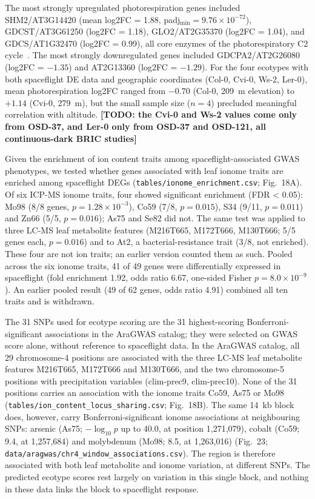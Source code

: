\documentclass[sn-mathphys-num,Basic]{sn-jnl}
\begin{document}
The most strongly upregulated photorespiration genes included SHM2/AT3G14420 (mean log2FC = 1.88, padj$_{\text{min}} = 9.76 \times 10^{-72}$), GDCST/AT3G61250 (log2FC = 1.18), GLO2/AT2G35370 (log2FC = 1.04), and GDCS/AT1G32470 (log2FC = 0.99), all core enzymes of the photorespiratory C2 cycle~\cite{Bauwe2012}. The most strongly downregulated genes included GDCPA2/AT2G26080 (log2FC = $-1.35$) and AT2G13360 (log2FC = $-1.29$). For the four ecotypes with both spaceflight DE data and geographic coordinates (Col-0, Cvi-0, Ws-2, Ler-0), mean photorespiration log2FC ranged from $-0.70$ (Col-0, 209~m elevation) to $+1.14$ (Cvi-0, 279~m), but the small sample size ($n = 4$) precluded meaningful correlation with altitude. \textbf{[TODO: the Cvi-0 and Ws-2 values come only from OSD-37, and Ler-0 only from OSD-37 and OSD-121, all continuous-dark BRIC studies]}

Given the enrichment of ion content traits among spaceflight-associated GWAS phenotypes, we tested whether genes associated with leaf ionome traits are enriched among spaceflight DEGs (\texttt{tables/ionome\_enrichment.csv}; Fig.~18A). Of six ICP-MS ionome traits, four showed significant enrichment (FDR < 0.05): Mo98 (8/8 genes, $p = 1.28 \times 10^{-3}$), Co59 (7/8, $p = 0.015$), S34 (9/11, $p = 0.011$) and Zn66 (5/5, $p = 0.016$); As75 and Se82 did not. The same test was applied to three LC-MS leaf metabolite features (M216T665, M172T666, M130T666; 5/5 genes each, $p = 0.016$) and to At2, a bacterial-resistance trait (3/8, not enriched). These four are not ion traits; an earlier version counted them as such. Pooled across the six ionome traits, 41 of 49 genes were differentially expressed in spaceflight (fold enrichment 1.92, odds ratio 6.67, one-sided Fisher $p = 8.0 \times 10^{-9}$). An earlier pooled result (49 of 62 genes, odds ratio 4.91) combined all ten traits and is withdrawn.

The 31 SNPs used for ecotype scoring are the 31 highest-scoring Bonferroni-significant associations in the AraGWAS catalog; they were selected on GWAS score alone, without reference to spaceflight data. In the AraGWAS catalog, all 29 chromosome-4 positions are associated with the three LC-MS leaf metabolite features M216T665, M172T666 and M130T666, and the two chromosome-5 positions with precipitation variables (clim-prec9, clim-prec10). None of the 31 positions carries an association with the ionome traits Co59, As75 or Mo98 (\texttt{tables/ion\_content\_locus\_sharing.csv}; Fig.~18B). The same 14~kb block does, however, carry Bonferroni-significant ionome associations at neighbouring SNPs: arsenic (As75; $-\log_{10} p$ up to 40.0, at position 1,271,079), cobalt (Co59; 9.4, at 1,257,684) and molybdenum (Mo98; 8.5, at 1,263,016) (Fig.~23; \texttt{data/aragwas/chr4\_window\_associations.csv}). The region is therefore associated with both leaf metabolite and ionome variation, at different SNPs. The predicted ecotype scores rest largely on variation in this single block, and nothing in these data links the block to spaceflight response.
\end{document}
